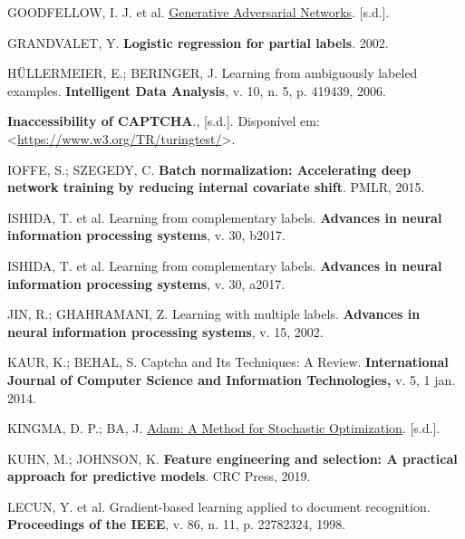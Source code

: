 \documentclass[12pt,twoside,brazilian]{book}
\newlength{\cslhangindent}
\newlength{\cslentryspacingunit} %
\newenvironment{CSLReferences}[2] %
 {%
  \setlength{\parindent}{0pt}
  \ifodd #1
  \let\oldpar\par
  \def\par{\hangindent=\cslhangindent\oldpar}
  \fi
  \setlength{\parskip}{#2\cslentryspacingunit}
 }%
 {}
\begin{document}
\begin{CSLReferences}{0}{1}
\leavevmode{}%
GOODFELLOW, I. J. et al.
\href{https://doi.org/10.48550/arXiv.1406.2661}{Generative Adversarial
Networks}. {[}s.d.{]}.

\leavevmode{}%
GRANDVALET, Y. \textbf{Logistic regression for partial labels}. 2002.

\leavevmode{}%
HÜLLERMEIER, E.; BERINGER, J. Learning from ambiguously labeled
examples. \textbf{Intelligent Data Analysis}, v. 10, n. 5, p. 419439,
2006.

\leavevmode{}%
\textbf{Inaccessibility of CAPTCHA}., {[}s.d.{]}. Disponível em:
\textless{}\url{https://www.w3.org/TR/turingtest/}\textgreater.

\leavevmode{}%
IOFFE, S.; SZEGEDY, C. \textbf{Batch normalization: Accelerating deep
network training by reducing internal covariate shift}. PMLR, 2015.

\leavevmode{}%
ISHIDA, T. et al. Learning from complementary labels. \textbf{Advances
in neural information processing systems}, v. 30, b2017.

\leavevmode{}%
ISHIDA, T. et al. Learning from complementary labels. \textbf{Advances
in neural information processing systems}, v. 30, a2017.

\leavevmode{}%
JIN, R.; GHAHRAMANI, Z. Learning with multiple labels. \textbf{Advances
in neural information processing systems}, v. 15, 2002.

\leavevmode{}%
KAUR, K.; BEHAL, S. Captcha and Its Techniques: A Review.
\textbf{International Journal of Computer Science and Information
Technologies,} v. 5, 1 jan. 2014.

\leavevmode{}%
KINGMA, D. P.; BA, J.
\href{https://doi.org/10.48550/arXiv.1412.6980}{Adam: A Method for
Stochastic Optimization}. {[}s.d.{]}.

\leavevmode{}%
KUHN, M.; JOHNSON, K. \textbf{Feature engineering and selection: A
practical approach for predictive models}. CRC Press, 2019.

\leavevmode{}%
LECUN, Y. et al. Gradient-based learning applied to document
recognition. \textbf{Proceedings of the IEEE}, v. 86, n. 11, p.
22782324, 1998.


\end{CSLReferences}
\end{document}
